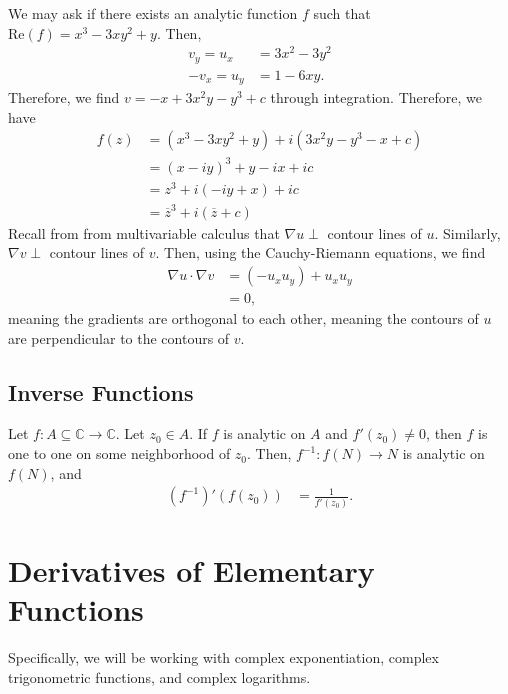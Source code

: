 \documentclass[10pt]{extarticle}
\newcommand{\C}{\mathbb{C}}
\begin{document}
  We may ask if there exists an analytic function $f$ such that $\text{Re}(f) = x^3 - 3xy^2 + y$. Then,
  \begin{align*}
    v_y = u_x &= 3x^2 - 3y^2\\
    -v_x = u_y &= 1-6xy.
  \end{align*}
  Therefore, we find $v = -x + 3x^2y - y^3 + c$ through integration. Therefore, we have
  \begin{align*}
    f(z) &= (x^3 - 3xy^2 + y) + i(3x^2y - y^3 - x + c)\\
         &= (x-iy)^3 + y-ix + ic\\
         &= z^3 + i(-iy + x) + ic\\
         &= \overline{z}^3  + i\left(\overline{z} + c\right)
  \end{align*}
  Recall from from multivariable calculus that $\nabla u \perp $ contour lines of $u$. Similarly, $\nabla v \perp$ contour lines of $v$. Then, using the Cauchy-Riemann equations, we find
  \begin{align*}
    \nabla u \cdot \nabla v &= (-u_xu_y) + u_xu_y\\
                            &= 0,
  \end{align*}
  meaning the gradients are orthogonal to each other, meaning the contours of $u$ are perpendicular to the contours of $v$.
  \subsection{Inverse Functions}%
  Let $f: A\subseteq \C \rightarrow \C$. Let $z_0\in A$. If $f$ is analytic on $A$ and $f'(z_0) \neq 0$, then $f$ is one to one on some neighborhood of $z_0$. Then, $f^{-1}: f(N)\rightarrow N$ is analytic on $f(N)$, and
  \begin{align*}
    (f^{-1})'(f(z_0)) &= \frac{1}{f'(z_0)}.
  \end{align*}
  \section{Derivatives of Elementary Functions}%
  Specifically, we will be working with complex exponentiation, complex trigonometric functions, and complex logarithms.
\end{document}
